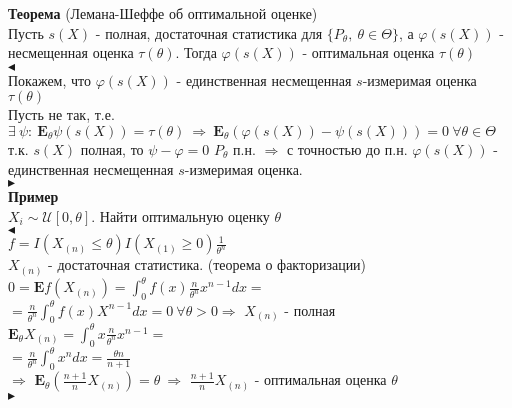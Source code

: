 \documentclass{article}
\begin{document}
\textbf{Теорема} (Лемана-Шеффе об оптимальной оценке)\\
Пусть $s(X)$ - полная, достаточная статистика для $\{P_\theta,\ \theta\in\Theta\}$, а $\varphi(s(X))$ - несмещенная оценка $\tau(\theta)$. Тогда $\varphi(s(X))$ - оптимальная оценка $\tau(\theta)$\\
$\blacktriangleleft$
\\
Покажем, что $\varphi(s(X))$ - единственная несмещенная $s$-измеримая оценка $\tau(\theta)$\\
Пусть не так, т.е. $\exists\ \psi:\ \mathbf{E}_\theta\psi(s(X)) = \tau(\theta)\ \Rightarrow \ \mathbf{E}_\theta(\varphi(s(X)) - \psi(s(X))) = 0\ \forall\theta\in\Theta$\\
т.к. $s(X)$ полная, то $\psi - \varphi = 0$ $P_\theta$ п.н. $\Rightarrow$  с точностью до п.н. $\varphi(s(X))$ - единственная несмещенная $s$-измеримая оценка.\\
$\blacktriangleright$\\
\textbf{Пример}\\
$X_i\sim\mathcal{U}[0,\theta]$. Найти оптимальную оценку $\theta$\\
$\blacktriangleleft$
\\
$f = I(X_{(n)}\leq\theta)I(X_{(1)}\geq 0)\frac{1}{\theta^n}$\\
$X_{(n)}$ - достаточная статистика. (теорема о факторизации)\\
$0 = \mathbf{E}f(X_{(n)}) = \int_0^\theta{f(x)\frac{n}{\theta^n}x^{n-1}dx} =$\\
$= \frac{n}{\theta^n}\int_0^\theta{f(x)X^{n-1}dx} = 0\ \forall\theta>0\Rightarrow $ $X_{(n)}$ - полная\\
$\mathbf{E}_\theta X_{(n)} = \int_0^\theta{x\frac{n}{\theta^n}x^{n-1}} = $\\
$= \frac{n}{\theta^n}\int_0^\theta{x^ndx} = \frac{\theta n}{n+1}$\\
$\Rightarrow$ $\mathbf{E}_\theta\left(\frac{n+1}{n}X_{(n)}\right) = \theta\ \Rightarrow$ $\frac{n+1}{n}X_{(n)}$ - оптимальная оценка $\theta$\\
$\blacktriangleright$
\end{document}
